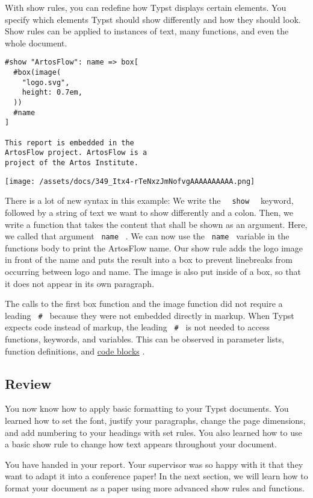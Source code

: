 With show rules, you can redefine how Typst displays certain elements.
You specify which elements Typst should show differently and how they
should look. Show rules can be applied to instances of text, many
functions, and even the whole document.

\begin{verbatim}
#show "ArtosFlow": name => box[
  #box(image(
    "logo.svg",
    height: 0.7em,
  ))
  #name
]

This report is embedded in the
ArtosFlow project. ArtosFlow is a
project of the Artos Institute.
\end{verbatim}

\texttt{[image: /assets/docs/349\_Itx4-rTeNxzJmNofvgAAAAAAAAAA.png]}

There is a lot of new syntax in this example: We write the
\texttt{\ }{\texttt{\ show\ }}\texttt{\ } keyword, followed by a string
of text we want to show differently and a colon. Then, we write a
function that takes the content that shall be shown as an argument.
Here, we called that argument \texttt{\ name\ } . We can now use the
\texttt{\ name\ } variable in the function\textquotesingle s body to
print the ArtosFlow name. Our show rule adds the logo image in front of
the name and puts the result into a box to prevent linebreaks from
occurring between logo and name. The image is also put inside of a box,
so that it does not appear in its own paragraph.

The calls to the first box function and the image function did not
require a leading \texttt{\ \#\ } because they were not embedded
directly in markup. When Typst expects code instead of markup, the
leading \texttt{\ \#\ } is not needed to access functions, keywords, and
variables. This can be observed in parameter lists, function
definitions, and \href{/docs/reference/scripting/}{code blocks} .

\subsection{Review}\label{review}

You now know how to apply basic formatting to your Typst documents. You
learned how to set the font, justify your paragraphs, change the page
dimensions, and add numbering to your headings with set rules. You also
learned how to use a basic show rule to change how text appears
throughout your document.

You have handed in your report. Your supervisor was so happy with it
that they want to adapt it into a conference paper! In the next section,
we will learn how to format your document as a paper using more advanced
show rules and functions.

